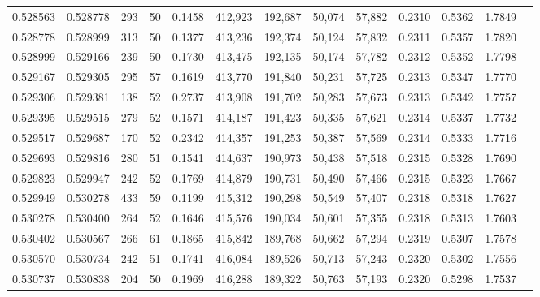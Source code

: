 \begin{tabular}{rrrrrrrrrrrrr}
0.528563 & 0.528778 &   293 &  50 &                                     0.1458 & 412,923 & 192,687 &  50,074 &  57,882 & 0.2310 & 0.5362 & 1.7849 \\
0.528778 & 0.528999 &   313 &  50 &                                     0.1377 & 413,236 & 192,374 &  50,124 &  57,832 & 0.2311 & 0.5357 & 1.7820 \\
0.528999 & 0.529166 &   239 &  50 &                                     0.1730 & 413,475 & 192,135 &  50,174 &  57,782 & 0.2312 & 0.5352 & 1.7798 \\
0.529167 & 0.529305 &   295 &  57 &                                     0.1619 & 413,770 & 191,840 &  50,231 &  57,725 & 0.2313 & 0.5347 & 1.7770 \\
0.529306 & 0.529381 &   138 &  52 &                                     0.2737 & 413,908 & 191,702 &  50,283 &  57,673 & 0.2313 & 0.5342 & 1.7757 \\
0.529395 & 0.529515 &   279 &  52 &                                     0.1571 & 414,187 & 191,423 &  50,335 &  57,621 & 0.2314 & 0.5337 & 1.7732 \\
0.529517 & 0.529687 &   170 &  52 &                                     0.2342 & 414,357 & 191,253 &  50,387 &  57,569 & 0.2314 & 0.5333 & 1.7716 \\
0.529693 & 0.529816 &   280 &  51 &                                     0.1541 & 414,637 & 190,973 &  50,438 &  57,518 & 0.2315 & 0.5328 & 1.7690 \\
0.529823 & 0.529947 &   242 &  52 &                                     0.1769 & 414,879 & 190,731 &  50,490 &  57,466 & 0.2315 & 0.5323 & 1.7667 \\
0.529949 & 0.530278 &   433 &  59 &                                     0.1199 & 415,312 & 190,298 &  50,549 &  57,407 & 0.2318 & 0.5318 & 1.7627 \\
0.530278 & 0.530400 &   264 &  52 &                                     0.1646 & 415,576 & 190,034 &  50,601 &  57,355 & 0.2318 & 0.5313 & 1.7603 \\
0.530402 & 0.530567 &   266 &  61 &                                     0.1865 & 415,842 & 189,768 &  50,662 &  57,294 & 0.2319 & 0.5307 & 1.7578 \\
0.530570 & 0.530734 &   242 &  51 &                                     0.1741 & 416,084 & 189,526 &  50,713 &  57,243 & 0.2320 & 0.5302 & 1.7556 \\
0.530737 & 0.530838 &   204 &  50 &                                     0.1969 & 416,288 & 189,322 &  50,763 &  57,193 & 0.2320 & 0.5298 & 1.7537 \\

\end{tabular}
